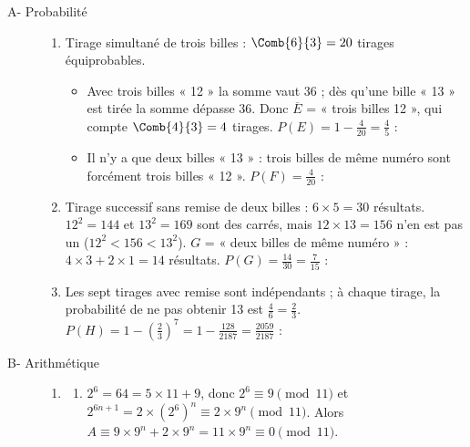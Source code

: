\begin{description}
	\item[A- Probabilité]
	\begin{enumerate}
		\item Tirage simultané de trois billes : $\Comb{6}{3} = 20$ tirages équiprobables.
		\begin{itemize}
			\item {}
				Avec trois billes « 12 » la somme vaut $36$ ; dès qu'une bille « 13 » est tirée la somme dépasse $36$.
				Donc $\overline{E}$ = « trois billes 12 », qui compte $\Comb{4}{3} = 4$ tirages.
				$P(E) = 1 - \frac{4}{20} = \frac{4}{5}$ : \par\noindent{}
			\item {}
				Il n'y a que deux billes « 13 » : trois billes de même numéro sont forcément trois billes « 12 ».
				$P(F) = \frac{4}{20}$ : \par\noindent{}
		\end{itemize}
		\item {}
			Tirage successif sans remise de deux billes : $6 \times 5 = 30$ résultats.
			$12^2 = 144$ et $13^2 = 169$ sont des carrés, mais $12 \times 13 = 156$ n'en est pas un ($12^2 < 156 < 13^2$).
			$G$ = « deux billes de même numéro » : $4 \times 3 + 2 \times 1 = 14$ résultats.
			$P(G) = \frac{14}{30} = \frac{7}{15}$ : \par\noindent{}
		\item {}
			Les sept tirages avec remise sont indépendants ; à chaque tirage, la probabilité de ne pas obtenir 13 est $\frac{4}{6} = \frac{2}{3}$.
			$P(H) = 1 - \left(\frac{2}{3}\right)^7 = 1 - \frac{128}{2187} = \frac{2059}{2187}$ : \par\noindent{}
	\end{enumerate}
	\item[B- Arithmétique]
	\begin{enumerate}
		\item
		\begin{enumerate}
			\item {}
				$2^6 = 64 = 5 \times 11 + 9$, donc $2^6 \equiv 9 \pmod{11}$ et $2^{6n+1} = 2 \times \left(2^6\right)^n \equiv 2 \times 9^n \pmod{11}$.
				Alors $A \equiv 9 \times 9^n + 2 \times 9^n = 11 \times 9^n \equiv 0 \pmod{11}$.
				\par\noindent{}

\end{enumerate}
\end{enumerate}
\end{description}
